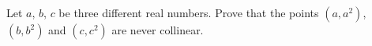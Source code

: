 Let $a$, $b$, $c$ be three different real numbers. Prove that the points $(a,a^2)$, $(b,b^2)$ and $(c,c^2)$ are never collinear.
